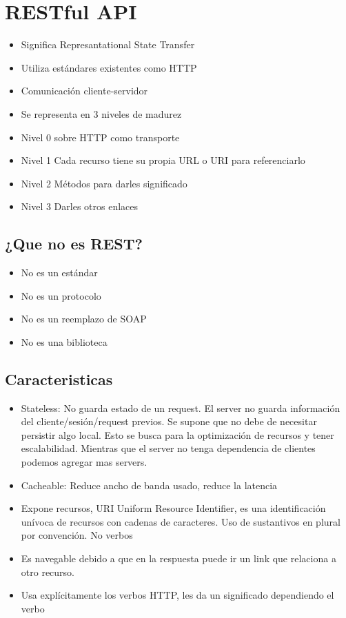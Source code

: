 \section{RESTful API}
\begin{itemize}
\item Significa Represantational State Transfer
\item Utiliza estándares existentes como HTTP
\item Comunicación cliente-servidor
\item Se representa en 3 niveles de madurez 
\item Nivel 0 sobre HTTP como transporte
\item Nivel 1 Cada recurso tiene su propia URL o URI para referenciarlo
\item Nivel 2 Métodos para darles significado
\item Nivel 3 Darles otros enlaces
\end{itemize}


\subsection*{¿Que no es REST?}

\begin{itemize}
\item No es un estándar
\item No es un protocolo
\item No es un reemplazo de SOAP
\item No es una biblioteca
\end{itemize}

\subsection*{Caracteristicas}

\begin{itemize}
\item Stateless: No guarda estado de un request. El server no guarda información del cliente/sesión/request previos. Se supone que no debe de necesitar persistir algo local. Esto se busca para la optimización de recursos y tener escalabilidad. Mientras que el server no tenga dependencia de clientes podemos agregar mas servers.
\item Cacheable: Reduce ancho de banda usado, reduce la latencia
\item Expone recursos, URI Uniform Resource Identifier, es una identificación unívoca de recursos con cadenas de caracteres. Uso de sustantivos en plural por convención. No verbos
\item Es navegable debido a que en la respuesta puede ir un link que relaciona a otro recurso.
\item Usa explícitamente los verbos HTTP, les da un significado dependiendo el verbo
\end{itemize}




